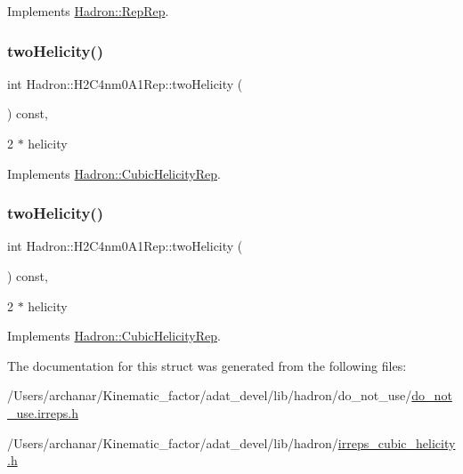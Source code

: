 Implements \mbox{\hyperlink{structHadron_1_1RepRep_ab3213025f6de249f7095892109575fde}{Hadron\+::\+Rep\+Rep}}.

\mbox{\label{structHadron_1_1H2C4nm0A1Rep_aa238eba0bfb059bc24baca59a75c48af}} 
\subsubsection{\texorpdfstring{twoHelicity()}{twoHelicity()}\hspace{0.1cm}{\footnotesize\ttfamily [1/2]}}
{\footnotesize\ttfamily int Hadron\+::\+H2\+C4nm0\+A1\+Rep\+::two\+Helicity (\begin{DoxyParamCaption}{ }\end{DoxyParamCaption}) const\hspace{0.3cm}{\ttfamily [inline]}, {\ttfamily [virtual]}}

2 $\ast$ helicity 

Implements \mbox{\hyperlink{structHadron_1_1CubicHelicityRep_af507aa56fc2747eacc8cb6c96db31ecc}{Hadron\+::\+Cubic\+Helicity\+Rep}}.

\mbox{\label{structHadron_1_1H2C4nm0A1Rep_aa238eba0bfb059bc24baca59a75c48af}} 
\subsubsection{\texorpdfstring{twoHelicity()}{twoHelicity()}\hspace{0.1cm}{\footnotesize\ttfamily [2/2]}}
{\footnotesize\ttfamily int Hadron\+::\+H2\+C4nm0\+A1\+Rep\+::two\+Helicity (\begin{DoxyParamCaption}{ }\end{DoxyParamCaption}) const\hspace{0.3cm}{\ttfamily [inline]}, {\ttfamily [virtual]}}

2 $\ast$ helicity 

Implements \mbox{\hyperlink{structHadron_1_1CubicHelicityRep_af507aa56fc2747eacc8cb6c96db31ecc}{Hadron\+::\+Cubic\+Helicity\+Rep}}.



The documentation for this struct was generated from the following files\+:\begin{DoxyCompactItemize}
\item 
/\+Users/archanar/\+Kinematic\+\_\+factor/adat\+\_\+devel/lib/hadron/do\+\_\+not\+\_\+use/\mbox{\hyperlink{do__not__use_8irreps_8h}{do\+\_\+not\+\_\+use.\+irreps.\+h}}\item 
/\+Users/archanar/\+Kinematic\+\_\+factor/adat\+\_\+devel/lib/hadron/\mbox{\hyperlink{lib_2hadron_2irreps__cubic__helicity_8h}{irreps\+\_\+cubic\+\_\+helicity.\+h}}\end{DoxyCompactItemize}
